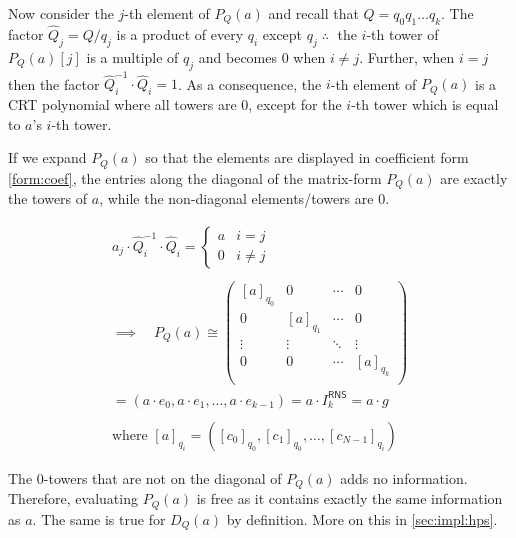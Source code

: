     Now consider the $j$-th element of $P_{Q}(a)$ and recall that $Q = q_0q_1\dots q_k$. The factor $\hat{Q}_j = Q/q_j$ is a product of every $q_i$ except $q_j \; \therefore\;$ the $i$-th tower of $P_{Q}(a)[j]$ is a multiple of $q_j$ and becomes $0$ when $i\not= j$. Further, when $i = j$ then the factor $\hat{Q}_i^{-1}\cdot\hat{Q}_i = 1$. As a consequence, the $i$-th element of $P_Q(a)$ is a CRT polynomial where all towers are 0, except for the $i$-th tower which is equal to $a$'s $i$-th tower. 
     
    If we expand $P_Q(a)$ so that the elements are displayed in coefficient form \eqref{form:coef}, the entries along the diagonal of the matrix-form $P_Q(a)$ are exactly the towers of $a$, while the non-diagonal elements/towers are 0. 
    
    \begin{gather*}
        a_j\cdot \hat{Q}_i^{-1}\cdot\hat{Q}_i = \begin{cases}
            a & i = j \\
            0 & i \not= j
        \end{cases}
    \\
    \\
        \implies\quad P_Q(a) \cong 
        \left(
            \begin{array}{c|c|c|c} 
                [a]_{q_0} & 0 & \cdots & 0 \\ 
                0 & [a]_{q_1} & \cdots & 0 \\
                \vdots & \vdots & \ddots & \vdots \\
                0 & 0 & \cdots & [a]_{q_k} \\
            \end{array}
        \right)
    \\
        = (a\cdot e_0, a\cdot e_1, \dots, a\cdot e_{k-1})
        = a\cdot I_k^{\mathsf{RNS}} = a\cdot g 
    \\ 
    \\
        \text{where } [a]_{q_i} = ([c_0]_{q_0}, [c_1]_{q_0}, \dots, [c_{N-1}]_{q_i}) 
\end{gather*}


\begin{remark}
    \label{remark:hps}
    The 0-towers that are not on the diagonal of $P_Q(a)$ adds no information. Therefore, evaluating $P_Q(a)$ is free as it contains exactly the same information as $a$. The same is true for $D_Q(a)$ by definition. More on this in \autoref{sec:impl:hps}.
\end{remark}

